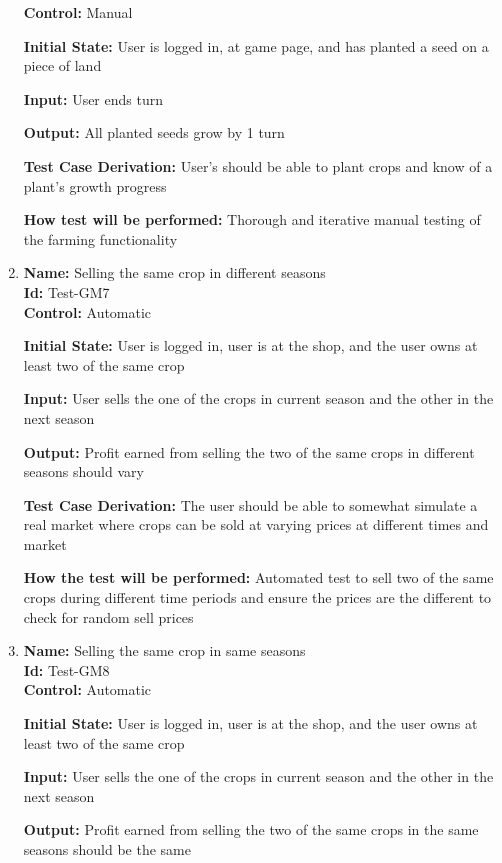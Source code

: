 \documentclass[12pt, titlepage]{article}
\begin{document}
\begin{enumerate}
\textbf{Control:} Manual
					
\textbf{Initial State:} User is logged in, at game page, and has planted a seed on a piece of land
					
\textbf{Input:} User ends turn
					
\textbf{Output:} All planted seeds grow by 1 turn

\textbf{Test Case Derivation:} User's should be able to plant crops and know of a plant's growth progress

\textbf{How test will be performed:} Thorough and iterative manual testing of the farming functionality

\item{\textbf{Name:} Selling the same crop in different seasons\\} %
\textbf{Id:} Test-GM7 \label{Test-GM7}\\

\textbf{Control: }Automatic

\textbf{Initial State:} User is logged in, user is at the shop, and the user owns at least two of the same crop

\textbf{Input:} User sells the one of the crops in current season and the other in the next season

\textbf{Output:} Profit earned from selling the two of the same crops in different seasons should vary 

\textbf{Test Case Derivation:} The user should be able to somewhat simulate a real market where crops can be sold at varying prices at different times and market

\textbf{How the test will be performed:} Automated test to sell two of the same crops during different time periods and ensure the prices are the different to check for random sell prices

\item{\textbf{Name:} Selling the same crop in same seasons\\} %
\textbf{Id:} Test-GM8 \label{Test-GM8}\\

\textbf{Control: }Automatic

\textbf{Initial State:} User is logged in, user is at the shop, and the user owns at least two of the same crop

\textbf{Input:} User sells the one of the crops in current season and the other in the next season

\textbf{Output:} Profit earned from selling the two of the same crops in the same seasons should be the same 


\end{enumerate}
\end{document}
